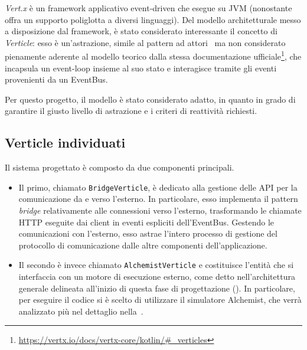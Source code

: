       \emph{Vert.x} è un framework applicativo event-driven che esegue su JVM (nonostante offra un supporto poliglotta a diversi linguaggi).
      Del modello architetturale messo a disposizione dal framework, è stato considerato interessante il concetto di \emph{Verticle}:
      esso è un'astrazione, simile al pattern ad attori~\cite{DBLP:conf/ijcai/HewittBS73} ma non considerato pienamente aderente al modello teorico dalla stessa documentazione ufficiale\footnote{\url{https://vertx.io/docs/vertx-core/kotlin/\#_verticles}},
      che incapsula un event-loop insieme al suo stato e interagisce tramite gli eventi provenienti da un EventBus.

      Per questo progetto, il modello è stato considerato adatto, in quanto in grado di garantire il giusto livello di astrazione e i criteri di reattività richiesti.

    \subsection{Verticle individuati}
      Il sistema progettato è composto da due componenti principali.

      \begin{itemize}
        \item
          Il primo, chiamato \texttt{BridgeVerticle}, è dedicato alla gestione delle API per la comunicazione da e verso l'esterno.
          In particolare, esso implementa il pattern \emph{bridge} relativamente alle connessioni verso l'esterno, trasformando le chiamate HTTP eseguite dai client in eventi espliciti dell'EventBus.
          Gestendo le comunicazioni con l'esterno, esso astrae l'intero processo di gestione del protocollo di comunicazione dalle altre componenti dell'applicazione.
        \item
          Il secondo è invece chiamato \texttt{AlchemistVerticle} e costituisce l'entità che si interfaccia con un motore di esecuzione esterno,
          come detto nell'architettura generale delineata all'inizio di questa fase di progettazione ().
          In particolare, per eseguire il codice si è scelto di utilizzare il simulatore Alchemist, che verrà analizzato più nel dettaglio nella~.
      \end{itemize}

